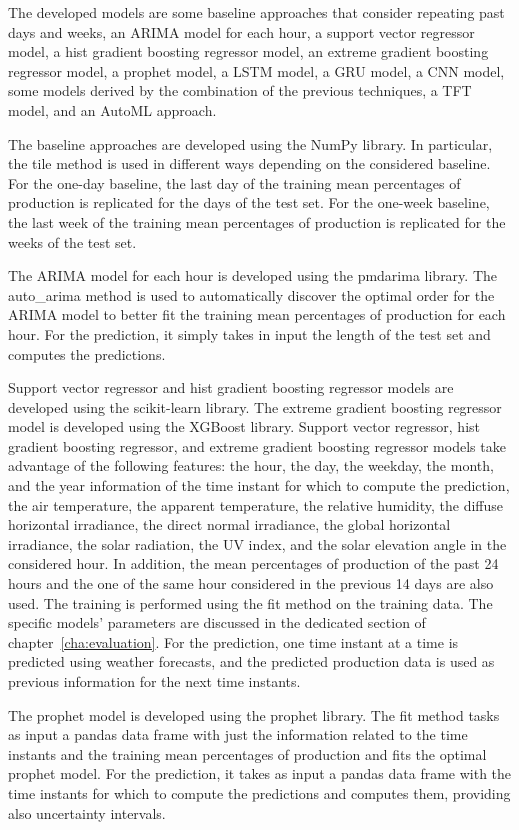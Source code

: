 The developed models are some baseline approaches that consider repeating past days and weeks, an ARIMA model for each hour, a support vector regressor model, a hist gradient boosting regressor model, an extreme gradient boosting regressor model, a prophet model, a LSTM model, a GRU model, a CNN model, some models derived by the combination of the previous techniques, a TFT model, and an AutoML approach.

The baseline approaches are developed using the NumPy library.
In particular, the tile method is used in different ways depending on the considered baseline.
For the one-day baseline, the last day of the training mean percentages of production is replicated for the days of the test set.
For the one-week baseline, the last week of the training mean percentages of production is replicated for the weeks of the test set.

The ARIMA model for each hour is developed using the pmdarima library.
The auto\_arima method is used to automatically discover the optimal order for the ARIMA model to better fit the training mean percentages of production for each hour.
For the prediction, it simply takes in input the length of the test set and computes the predictions.

Support vector regressor and hist gradient boosting regressor models are developed using the scikit-learn library.
The extreme gradient boosting regressor model is developed using the XGBoost library.
Support vector regressor, hist gradient boosting regressor, and extreme gradient boosting regressor models take advantage of the following features: the hour, the day, the weekday, the month, and the year information of the time instant for which to compute the prediction, the air temperature, the apparent temperature, the relative humidity, the diffuse horizontal irradiance, the direct normal irradiance, the global horizontal irradiance, the solar radiation, the UV index, and the solar elevation angle in the considered hour.
In addition, the mean percentages of production of the past 24 hours and the one of the same hour considered in the previous 14 days are also used.
The training is performed using the fit method on the training data.
The specific models’ parameters are discussed in the dedicated section of chapter~\ref{cha:evaluation}.
For the prediction, one time instant at a time is predicted using weather forecasts, and the predicted production data is used as previous information for the next time instants.

The prophet model is developed using the prophet library.
The fit method tasks as input a pandas data frame with just the information related to the time instants and the training mean percentages of production and fits the optimal prophet model.
For the prediction, it takes as input a pandas data frame with the time instants for which to compute the predictions and computes them, providing also uncertainty intervals.

